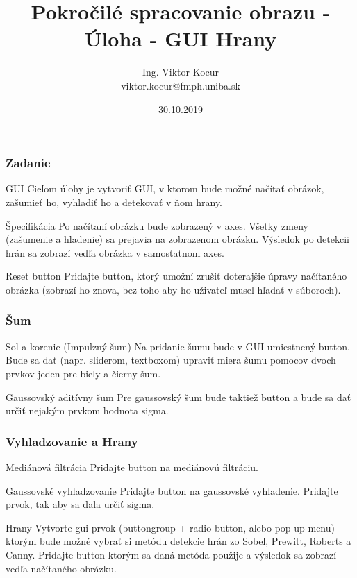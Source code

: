 \documentclass{beamer}
\title[1. Úloha]{Pokročilé spracovanie obrazu - Úloha - GUI Hrany}
\author[Kocur]{Ing. Viktor Kocur \\{\small viktor.kocur@fmph.uniba.sk}}
\institute{DAI FMFI UK}
\date{30.10.2019}
\begin{document}

\begin{frame}
  \titlepage
\end{frame}

\begin{frame}
\frametitle{Zadanie}
\begin{block}{GUI}
Cieľom úlohy je vytvoriť GUI, v ktorom bude možné načítať obrázok, zašumieť ho, vyhladiť ho a detekovať v ňom hrany.
\end{block}

\begin{block}{Špecifikácia}
Po načítaní obrázku bude zobrazený v axes. Všetky zmeny (zašumenie a hladenie) sa prejavia na zobrazenom obrázku. Výsledok po detekcii hrán sa zobrazí vedľa obrázka v samostatnom axes.
\end{block}


\begin{block}{Reset button}
Pridajte button, ktorý umožní zrušiť doterajšie úpravy načítaného obrázka (zobrazí ho znova, bez toho aby ho uživateľ musel hľadať v súboroch).
\end{block}
\end{frame}


\begin{frame}
\frametitle{Šum}
\begin{block}{Sol a korenie (Impulzný šum)}
Na pridanie šumu bude v GUI umiestnený button. Bude sa dať (napr. sliderom, textboxom) upraviť miera šumu pomocov dvoch prvkov jeden pre biely a čierny šum.
\end{block}

\begin{block}{Gaussovský aditívny šum}
Pre gaussovský šum bude taktiež button a bude sa dať určiť nejakým prvkom hodnota sigma.
\end{block}
\end{frame}

\begin{frame}
\frametitle{Vyhladzovanie a Hrany}

\begin{block}{Mediánová filtrácia}
Pridajte button na mediánovú filtráciu. 
\end{block}

\begin{block}{Gaussovské vyhladzovanie}
Pridajte button na gaussovské vyhladenie. Pridajte prvok, tak aby sa dala určiť sigma.
\end{block}

\begin{block}{Hrany}
Vytvorte gui prvok (buttongroup + radio button, alebo pop-up menu) ktorým bude možné vybrať si metódu detekcie hrán zo Sobel, Prewitt, Roberts a Canny. Pridajte button ktorým sa daná metóda použije a výsledok sa zobrazí vedľa načítaného obrázku.
\end{block}
\end{frame}
\end{document}
